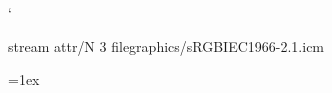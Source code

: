 \usepackage{xmpincl}
\usepackage{hyperxmp}

\def\convertDate{%
    \getYear
}
{\catcode`
 \gdef\getYear D:#1#2#3#4{\edef\xYear{#1#2#3#4}\getMonth}
}
\def\getMonth#1#2{\edef\xMonth{#1#2}\getDay}
\def\getDay#1#2{\edef\xDay{#1#2}\getHour}
\def\getHour#1#2{\edef\xHour{#1#2}\getMin}
\def\getMin#1#2{\edef\xMin{#1#2}\getSec}
\def\getSec#1#2{\edef\xSec{#1#2}\getTZh}
\def\getTZh +#1#2{\edef\xTZh{#1#2}\getTZm}
\def\getTZm '#1#2'{%
    \edef\xTZm{#1#2}%
    \edef\convDate{\xYear-\xMonth-\xDay T\xHour:\xMin:\xSec+\xTZh:\xTZm}%
}
\expandafter\convertDate\pdfcreationdate


\immediate\pdfobj stream attr{/N 3}  file{graphics/sRGBIEC1966-2.1.icm}

\providecommand{\xmpOrg}{Tomas Bata University in Zlín, Czech Republic}
\providecommand{\xmpProducer}{}
\providecommand{\xmpDoi}{}
\providecommand{\xmpJournalnumber}{}
\providecommand{\xmpVolume}{}
\providecommand{\xmpIssue}{}
\providecommand{\xmpCoverDisplayDate}{}
\providecommand{\xmpCoverDate}{}
\providecommand{\xmpJournaltitle}{}
\providecommand{\xmpFirstpage}{}
\providecommand{\xmpLastpage}{}
\providecommand{\xmpAuthoritativeDomain}{}
\providecommand{\xmpCreatorTool}{}



\newcommand{\valueTextHeight}{242mm}	%
\newcommand{\valueTextWidth}{155mm}	%
\newcommand{\valueVOffset}{-1.61cm}	%
\newcommand{\valueSideMargin}{0.96cm}	%
\newcommand{\valueHeadHeight}{0.6cm}	%
\newcommand{\valueHeadSep}{1cm}	%

\textheight=\valueTextHeight
\textwidth=\valueTextWidth
\voffset=\valueVOffset

\oddsidemargin=\valueSideMargin
\evensidemargin=\valueSideMargin

\headheight=\valueHeadHeight
\headsep=\valueHeadSep

\footskip=1ex
\cfoot{}
\marginparpush=0mm
\marginparwidth=0mm
\marginparsep=0mm


